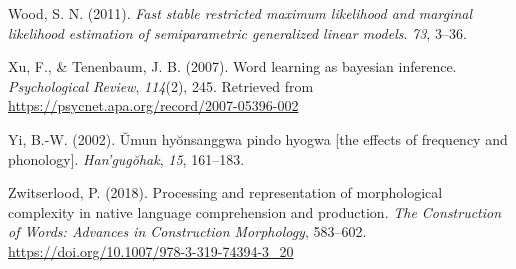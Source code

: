 \documentclass[
  man,floatsintext]{apa6}
\newlength{\cslhangindent}
\newenvironment{CSLReferences}[2] %
 {\begin{list}{}{%
  \setlength{\itemindent}{0pt}
  \setlength{\leftmargin}{0pt}
  \setlength{\parsep}{0pt}
  \ifodd #1
   \setlength{\leftmargin}{\cslhangindent}
   \setlength{\itemindent}{-1\cslhangindent}
  \fi
  \setlength{\itemsep}{#2\baselineskip}}}
 {\end{list}}
\begin{document}
\begin{CSLReferences}{1}{0}
Wood, S. N. (2011). \emph{Fast stable restricted maximum likelihood and marginal likelihood estimation of semiparametric generalized linear models}. \emph{73}, 3--36.

Xu, F., \& Tenenbaum, J. B. (2007). Word learning as bayesian inference. \emph{Psychological Review}, \emph{114}(2), 245. Retrieved from \url{https://psycnet.apa.org/record/2007-05396-002}

Yi, B.-W. (2002). Ŭmun hyŏnsanggwa pindo hyogwa {[}the effects of frequency and phonology{]}. \emph{Han'gugŏhak}, \emph{15}, 161--183.

Zwitserlood, P. (2018). Processing and representation of morphological complexity in native language comprehension and production. \emph{The Construction of Words: Advances in Construction Morphology}, 583--602. \url{https://doi.org/10.1007/978-3-319-74394-3_20}

\end{CSLReferences}
\end{document}
